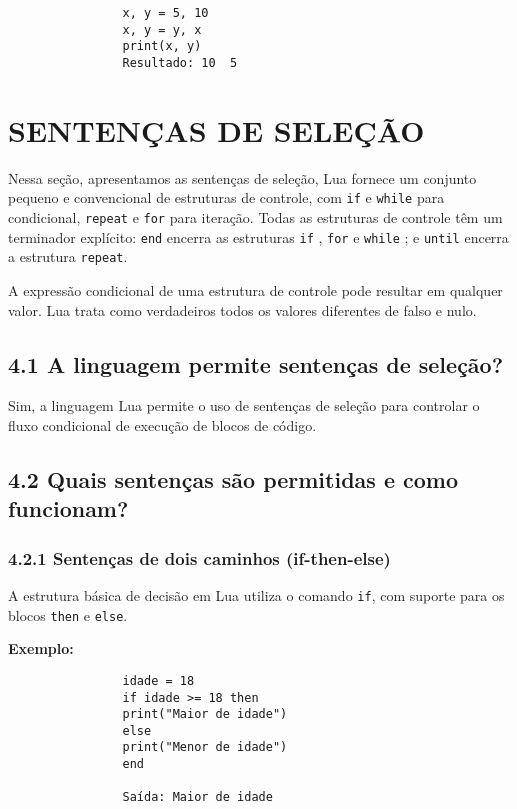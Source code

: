 \documentclass[12pt,a4paper]{article}
\begin{document}
			\begin{verbatim}
				x, y = 5, 10
				x, y = y, x
				print(x, y) 
				Resultado: 10  5
			\end{verbatim}
			\newpage
			
			\section{SENTENÇAS DE SELEÇÃO}
			
			Nessa seção, apresentamos as sentenças de seleção, Lua fornece um conjunto pequeno e convencional de estruturas de controle, com \verb|if| e \verb|while| para condicional, \verb|repeat| e \verb|for| para iteração. Todas as estruturas de controle têm um terminador explícito: \verb|end| encerra as estruturas \verb|if| , \verb|for| e \verb|while| ; e \verb|until| encerra a estrutura \verb|repeat|.
			
			A expressão condicional de uma estrutura de controle pode resultar em qualquer valor. Lua trata como verdadeiros todos os valores diferentes de falso e nulo. 
			
			\subsection*{4.1 A linguagem permite sentenças de seleção?}
			
			Sim, a linguagem Lua permite o uso de sentenças de seleção para controlar o fluxo condicional de execução de blocos de código.
			
			\subsection*{4.2 Quais sentenças são permitidas e como funcionam?}
			
			\subsubsection*{4.2.1 Sentenças de dois caminhos (if-then-else)}
			
			A estrutura básica de decisão em Lua utiliza o comando \verb|if|, com suporte para os blocos \verb|then| e \verb|else|.
			
			\textbf{Exemplo:}
			\begin{verbatim}
				idade = 18
				if idade >= 18 then
				print("Maior de idade")
				else
				print("Menor de idade")
				end
				
				Saída: Maior de idade
			\end{verbatim}
			
\end{document}
